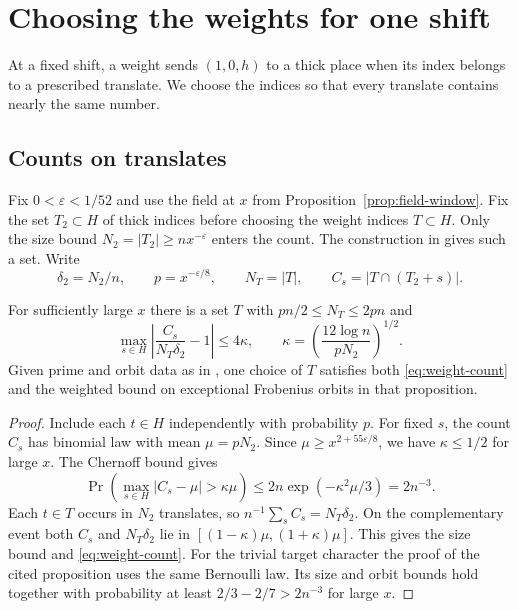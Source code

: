 \section{Choosing the weights for one shift}\label{sec:weights}

At a fixed shift, a weight sends $(1,0,h)$ to a thick place when its
index belongs to a prescribed translate. We choose the indices so that
every translate contains nearly the same number.

\subsection{Counts on translates}

Fix $0<\varepsilon<1/52$ and use the field at $x$ from
Proposition~\ref{prop:field-window}. Fix the set $T_2\subset H$ of
thick indices before choosing the weight indices $T\subset H$.
Only the size bound $N_2=|T_2|\ge n x^{-\varepsilon}$ enters the count.
The construction in \citep[Proposition~5.17]{adriazola-grh} gives
such a set. Write
\[
  \delta_2=N_2/n,\qquad p=x^{-\varepsilon/8},\qquad
  N_T=|T|,\qquad C_s=|T\cap(T_2+s)|.
\]

\begin{lemma}\label{lem:weight-count}
For sufficiently large $x$ there is a set $T$ with
$pn/2\le N_T\le 2pn$ and
\begin{equation}\label{eq:weight-count}
   \max_{s\in H}\left|\frac{C_s}{N_T\delta_2}-1\right|\le4\kappa,
   \qquad \kappa=\left(\frac{12\log n}{pN_2}\right)^{1/2}.
\end{equation}
Given prime and orbit data as in \citep[Proposition~5.20]{adriazola-grh},
one choice of $T$ satisfies both \eqref{eq:weight-count} and the
weighted bound on exceptional Frobenius orbits in that proposition.
\end{lemma}

\begin{proof}
Include each $t\in H$ independently with probability $p$. For fixed
$s$, the count $C_s$ has binomial law with mean $\mu=pN_2$.
Since $\mu\ge x^{2+55\varepsilon/8}$, we have $\kappa\le1/2$ for
large $x$. The Chernoff bound gives
\[
  \Pr\!\left(\max_{s\in H}|C_s-\mu|>\kappa\mu\right)
  \le 2n\exp(-\kappa^2\mu/3)=2n^{-3}.
\]
Each $t\in T$ occurs in $N_2$ translates, so
$n^{-1}\sum_s C_s=N_T\delta_2$. On the complementary event both
$C_s$ and $N_T\delta_2$ lie in $[(1-\kappa)\mu,(1+\kappa)\mu]$.
This gives the size bound and \eqref{eq:weight-count}. For the trivial
target character the proof of the cited proposition uses the same
Bernoulli law. Its size and orbit bounds hold together with probability
at least $2/3-2/7>2n^{-3}$ for large $x$.
\end{proof}

